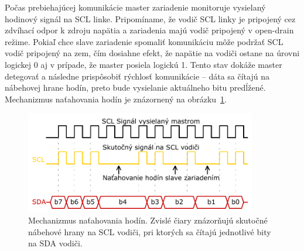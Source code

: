 Počas prebiehajúcej komunikácie master zariadenie monitoruje vysielaný hodinový signál na SCL linke. Pripomíname, že vodič SCL linky je pripojený cez zdvíhací odpor k zdroju napätia a zariadenia majú vodič pripojený v open-drain režime. Pokiaľ chce slave zariadenie spomaliť komunikáciu môže podržať SCL vodič pripojený na zem, čím dosiahne efekt, že napätie na vodiči ostane na úrovni logickej 0 aj v prípade, že master posiela logickú 1. Tento stav dokáže master detegovať a následne prispôsobiť rýchlosť komunikácie -- dáta sa čítajú na nábehovej hrane hodín, preto bude vysielanie aktuálneho bitu predĺžené. Mechanizmus naťahovania hodín je znázornený na obrázku~\ref{obr:i2cStretch}.

\begin{figure}
    \centerline{\includegraphics[width=0.9\textwidth]{images/busses/i2cStretch.pdf}}
    \caption[Mechanizmus naťahovania hodín]{Mechanizmus naťahovania hodín. Zvislé čiary znázorňujú skutočné nábehové hrany na SCL vodiči, pri ktorých sa čítajú jednotlivé bity na SDA vodiči.}
    \label{obr:i2cStretch}
\end{figure}